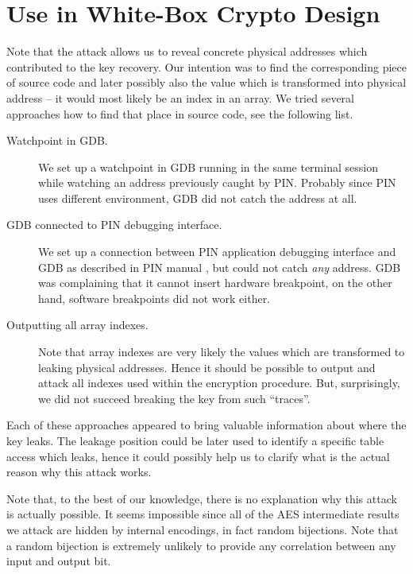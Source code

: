 \section{Use in White-Box Crypto Design}
\label{sec:useindesign}

Note that the attack allows us to reveal concrete physical addresses which contributed to the key recovery. Our intention was to find the corresponding piece of source code and later possibly also the value which is transformed into physical address -- it would most likely be an index in an array. We tried several approaches how to find that place in source code, see the following list.

\begin{description}
	\item[Watchpoint in GDB.]
		We set up a watchpoint in GDB running in the same terminal session while watching an address previously caught by PIN. Probably since PIN uses different environment, GDB did not catch the address at all.
	\item[GDB connected to PIN debugging interface.]
		We set up a connection between PIN application debugging interface and GDB as described in PIN manual \cite{pin214manual}, but could not catch {\em any} address. GDB was complaining that it cannot insert hardware breakpoint, on the other hand, software breakpoints did not work either.
	\item[Outputting all array indexes.]
		Note that array indexes are very likely the values which are transformed to leaking physical addresses. Hence it should be possible to output and attack all indexes used within the encryption procedure. But, surprisingly, we did not succeed breaking the key from such ``traces''.
\end{description}

Each of these approaches appeared to bring valuable information about where the key leaks. The leakage position could be later used to identify a specific table access which leaks, hence it could possibly help us to clarify what is the actual reason why this attack works.

Note that, to the best of our knowledge, there is no explanation why this attack is actually possible. It seems impossible since all of the AES intermediate results we attack are hidden by internal encodings, in fact random bijections. Note that a random bijection is extremely unlikely to provide any correlation between any input and output bit.

